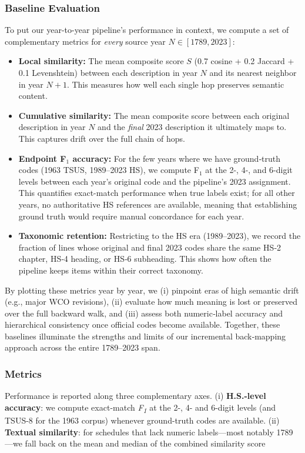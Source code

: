 \documentclass[12pt]{article}
\begin{document}
\subsubsection{Baseline Evaluation}
To put our year-to-year pipeline’s performance in context, we compute a set of complementary metrics for \emph{every} source year $N\in[1789,2023]$:

\begin{itemize}
  \item \textbf{Local similarity:} The mean composite score $S$ (0.7 cosine + 0.2 Jaccard + 0.1 
  Levenshtein) between each description in year $N$ and its nearest neighbor in year $N+1$.  This measures how well each single hop preserves semantic content.
  \item \textbf{Cumulative similarity:} The mean composite score between each original description in year $N$ and the \emph{final} 2023 description it ultimately maps to.  This captures drift over the full chain of hops.
\item \textbf{Endpoint F$_1$ accuracy:} For the few years where we have ground‐truth codes (1963 TSUS, 1989–2023 HS), we compute F$_1$ at the 2-, 4-, and 6-digit levels between each year’s original code and the pipeline’s 2023 assignment. This quantifies exact-match performance when true labels exist; for all other years, no authoritative HS references are available, meaning that establishing ground truth would require manual concordance for each year.  
  \item \textbf{Taxonomic retention:} Restricting to the HS era (1989–2023), we record the fraction of lines whose original and final 2023 codes share the same HS‐2 chapter, HS‐4 heading, or HS‐6 subheading.  This shows how often the pipeline keeps items within their correct taxonomy.
\end{itemize}

By plotting these metrics year by year, we (i) pinpoint eras of high semantic drift (e.g., major WCO revisions), (ii) evaluate how much meaning is lost or preserved over the full backward walk, and (iii) assess both numeric‐label accuracy and hierarchical consistency once official codes become available.  Together, these baselines illuminate the strengths and limits of our incremental back‐mapping approach across the entire 1789–2023 span.

\subsubsection{Metrics}
Performance is reported along three complementary axes.
(i) \textbf{H.S.-level accuracy}: we compute exact-match \emph{F\textsubscript{1}} at the 2-, 4- and 6-digit levels (and TSUS-8 for the 1963 corpus) whenever ground-truth codes are available.
(ii) \textbf{Textual similarity}: for schedules that lack numeric labels—most notably 1789—we fall back on the mean and median of the combined similarity score 
\end{document}
